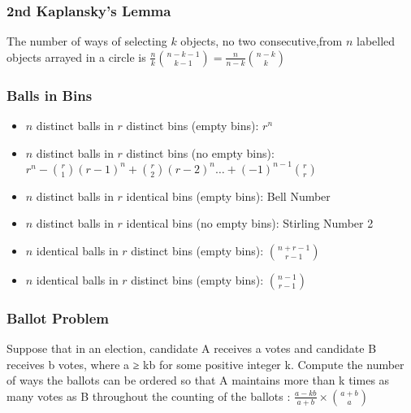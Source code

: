 \begin{small}
  \subsubsection{2nd Kaplansky's Lemma}
  The number of ways of selecting \( k \) objects, no two consecutive,from \( n \) labelled objects arrayed in a circle is \( \frac{n}{k} \binom{n-k-1}{k-1} = \frac{n}{n - k} \binom{n-k}{k} \)

  \subsubsection{Balls in Bins}
  \begin{itemize}[noitemsep]
    \itemsep0em 
    \item $n$ distinct balls in $r$ distinct bins (empty bins): $r^{n}$
    \item $n$ distinct balls in $r$ distinct bins (no empty bins): $r^{n} - \binom{r}{1} (r - 1)^{n} + \binom{r}{2} (r - 2)^{n} \ldots + (-1)^{n - 1} \binom{r}{r}$
    \item $n$ distinct balls in $r$ identical bins (empty bins): Bell Number
    \item $n$ distinct balls in $r$ identical bins (no empty bins): Stirling Number 2
    \item $n$ identical balls in $r$ distinct bins (empty bins): $\binom{n + r - 1}{r - 1}$
    \item $n$ identical balls in $r$ distinct bins (empty bins): $\binom{n - 1}{r - 1}$
  \end{itemize}

  \subsubsection{Ballot Problem}
  Suppose that in an election, candidate A receives a votes and candidate B receives b votes, where a ≥ kb for some positive integer k. Compute the number of ways the ballots can be ordered so that A maintains more than k times as many votes as B throughout the counting of the ballots : $\frac{a - kb}{a + b} \times \binom{a + b}{a}$


\end{small}
